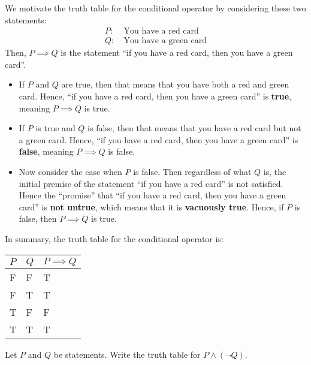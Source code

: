 We motivate the truth table for the conditional operator by considering these two statements:
\begin{align*}
    P: &\ \text{You have a red card}\\
    Q: &\ \text{You have a green card}
\end{align*}
Then, $P \implies Q$ is the statement ``if you have a red card, then you have a green card''.
\begin{itemize}
    \item If $P$ and $Q$ are true, then that means that you have both a red and green card. Hence, ``if you have a red card, then you have a green card'' is \textbf{true}, meaning $P \implies Q$ is true.
    \item If $P$ is true and $Q$ is false, then that means that you have a red card but not a green card. Hence, ``if you have a red card, then you have a green card'' is \textbf{false}, meaning $P \implies Q$ is false.
    \item Now consider the case when $P$ is false. Then regardless of what $Q$ is, the initial premise of the statement ``if you have a red card'' is not satisfied. Hence the ``promise'' that ``if you have a red card, then you have a green card'' is \textbf{not untrue}, which means that it is \textbf{vacuously true}. Hence, if $P$ is false, then $P \implies Q$ is true.
\end{itemize}
In summary, the truth table for the conditional operator is:
\begin{table}[h]
    \centering
    \begin{tabular}{|l|l||l|}
        \hline
        $P$ & $Q$ & $P\implies Q$ \\ \hline
        F   & F   & T             \\ \hline
        F   & T   & T             \\ \hline
        T   & F   & F             \\ \hline
        T   & T   & T             \\ \hline
    \end{tabular}
\end{table}

\begin{exercise}
    Let $P$ and $Q$ be statements. Write the truth table for $P \land (\lnot Q)$.
\end{exercise}

